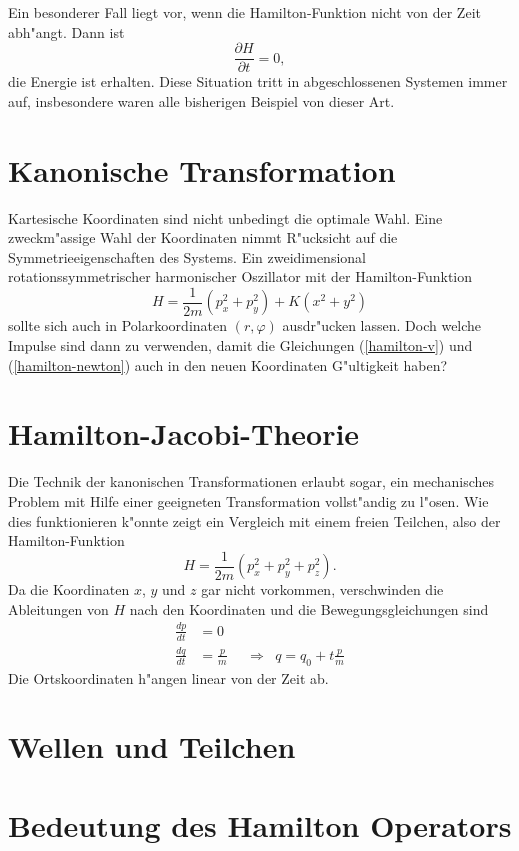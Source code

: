 Ein besonderer Fall liegt vor, wenn die Hamilton-Funktion nicht von
der Zeit abh"angt. Dann ist
\[
\frac{\partial H}{\partial t}=0,
\]
die Energie ist erhalten. Diese Situation tritt in abgeschlossenen
Systemen immer auf, insbesondere waren alle bisherigen Beispiel
von dieser Art.

\section{Kanonische Transformation}
Kartesische Koordinaten sind nicht unbedingt die optimale Wahl.
Eine zweckm"assige Wahl der Koordinaten nimmt R"ucksicht auf die
Symmetrieeigenschaften des Systems.
Ein zweidimensional rotationssymmetrischer harmonischer Oszillator mit 
der Hamilton-Funktion
\[
H=\frac1{2m}(p_x^2+p_y^2)+K(x^2 + y^2)
\]
sollte sich auch in Polarkoordinaten $(r,\varphi)$ ausdr"ucken lassen. 
Doch welche Impulse sind dann zu verwenden, damit die Gleichungen
(\ref{hamilton-v}) und (\ref{hamilton-newton}) auch in den neuen
Koordinaten G"ultigkeit haben?

\section{Hamilton-Jacobi-Theorie}
Die Technik der kanonischen Transformationen erlaubt sogar, ein mechanisches
Problem mit Hilfe einer geeigneten Transformation vollst"andig zu l"osen.
Wie dies funktionieren k"onnte zeigt ein Vergleich mit einem freien
Teilchen, also der Hamilton-Funktion
\[
H=\frac1{2m}(p_x^2+p_y^2+p_z^2).
\]
Da die Koordinaten $x$, $y$ und $z$ gar nicht vorkommen, verschwinden
die Ableitungen von $H$ nach den Koordinaten und die Bewegungsgleichungen
sind
\begin{align*}
\frac{dp}{dt}&=0\\
\frac{dq}{dt}&=\frac{p}{m}
&&\Rightarrow&q=q_0+t\frac{p}{m}
\end{align*}
Die Ortskoordinaten h"angen linear von der Zeit ab.

\section{Wellen und Teilchen}

\section{Bedeutung des Hamilton Operators}
